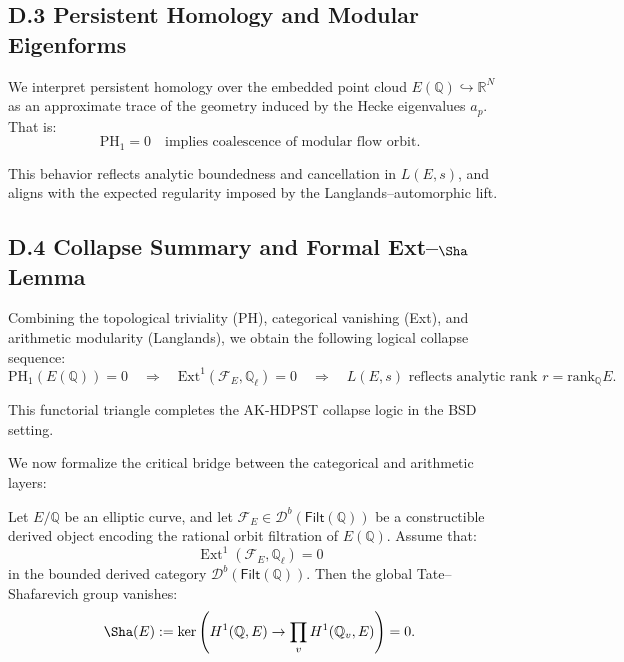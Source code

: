 \subsection*{D.3 Persistent Homology and Modular Eigenforms}

We interpret persistent homology over the embedded point cloud \( E(\mathbb{Q}) \hookrightarrow \mathbb{R}^N \) as an approximate trace of the geometry induced by the Hecke eigenvalues \( a_p \).  
That is:
\[
\mathrm{PH}_1 = 0 \quad \text{implies coalescence of modular flow orbit}.
\]

This behavior reflects analytic boundedness and cancellation in \( L(E, s) \), and aligns with the expected regularity imposed by the Langlands–automorphic lift.


\subsection*{D.4 Collapse Summary and Formal Ext--\texorpdfstring{$\Sha$}{Sha} Lemma}

Combining the topological triviality (PH), categorical vanishing (Ext), and arithmetic modularity (Langlands), we obtain the following logical collapse sequence:
\[
\mathrm{PH}_1(E(\mathbb{Q})) = 0
\quad \Rightarrow \quad
\mathrm{Ext}^1(\mathcal{F}_E, \mathbb{Q}_\ell) = 0
\quad \Rightarrow \quad
L(E,s) \text{ reflects analytic rank } r = \mathrm{rank}_\mathbb{Q}E.
\]

This functorial triangle completes the AK-HDPST collapse logic in the BSD setting.

We now formalize the critical bridge between the categorical and arithmetic layers:

\begin{lemma}[Ext-Class Collapse Implies \texorpdfstring{$\Sha(E) = 0$}{Sha=0}]
\label{lem:ext-sha}
Let \( E/\mathbb{Q} \) be an elliptic curve, and let \( \mathcal{F}_E \in \mathcal{D}^b(\mathsf{Filt}(\mathbb{Q})) \) be a constructible derived object encoding the rational orbit filtration of \( E(\mathbb{Q}) \).  
Assume that:
\[
\operatorname{Ext}^1(\mathcal{F}_E, \mathbb{Q}_\ell) = 0
\]
in the bounded derived category \( \mathcal{D}^b(\mathsf{Filt}(\mathbb{Q})) \).  
Then the global Tate–Shafarevich group vanishes:
\[
\Sha(E) := \ker\left( H^1(\mathbb{Q}, E) \rightarrow \prod_v H^1(\mathbb{Q}_v, E) \right) = 0.
\]
\end{lemma}

